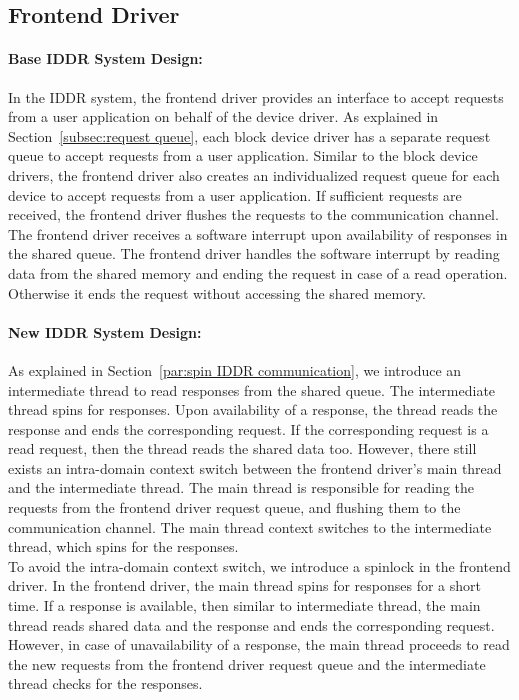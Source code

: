 \subsection{Frontend Driver}
\paragraph{Base IDDR System Design:}
In the IDDR system, the frontend driver provides an interface to accept requests from a user application on behalf of the device driver. As explained in Section~\ref{subsec:request queue}, each block device driver has a separate request queue to accept requests from a user application. Similar to the block device drivers, the frontend driver also creates an individualized request queue for each device to accept requests from a user application. If sufficient requests are received, the frontend driver flushes the requests to the communication channel. The frontend driver receives a software interrupt upon availability of responses in the shared queue. The frontend driver handles the software interrupt by reading data from the shared memory and ending the request in case of a read operation. Otherwise it ends the request without accessing the shared memory.

\paragraph{New IDDR System Design:}
As explained in Section~\ref{par:spin IDDR communication}, we introduce an intermediate thread to read responses from the shared queue. The intermediate thread spins for responses. Upon availability of a response, the thread reads the response and ends the corresponding request. If the corresponding request is a read request, then the thread reads the shared data too. However, there still exists an intra-domain context switch between the frontend driver's main thread and the intermediate thread. The main thread is responsible for reading the requests from the frontend driver request queue, and flushing them to the communication channel. The main thread context switches to the intermediate thread, which spins for the responses. 
\\[3mm]
To avoid the intra-domain context switch, we introduce a spinlock in the frontend driver. In the frontend driver, the main thread spins for responses for a short time. If a response is available, then similar to intermediate thread, the main thread reads shared data and the response and ends the corresponding request. However, in case of unavailability of a response, the main thread proceeds to read the new requests from the frontend driver request queue and the intermediate thread checks for the responses.  


